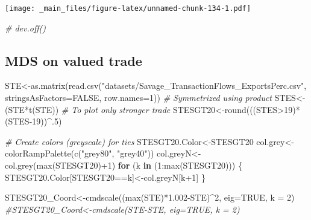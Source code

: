 \documentclass[
  notitlepage,
  onecolumn,
  openany]{book}
\newenvironment{Shaded}{\begin{snugshade}}{\end{snugshade}}
\newcommand{\AttributeTok}[1]{\textcolor[rgb]{0.77,0.63,0.00}{#1}}
\newcommand{\CommentTok}[1]{\textcolor[rgb]{0.56,0.35,0.01}{\textit{#1}}}
\newcommand{\ConstantTok}[1]{\textcolor[rgb]{0.00,0.00,0.00}{#1}}
\newcommand{\ControlFlowTok}[1]{\textcolor[rgb]{0.13,0.29,0.53}{\textbf{#1}}}
\newcommand{\DecValTok}[1]{\textcolor[rgb]{0.00,0.00,0.81}{#1}}
\newcommand{\FloatTok}[1]{\textcolor[rgb]{0.00,0.00,0.81}{#1}}
\newcommand{\FunctionTok}[1]{\textcolor[rgb]{0.00,0.00,0.00}{#1}}
\newcommand{\NormalTok}[1]{#1}
\newcommand{\OtherTok}[1]{\textcolor[rgb]{0.56,0.35,0.01}{#1}}
\newcommand{\SpecialCharTok}[1]{\textcolor[rgb]{0.00,0.00,0.00}{#1}}
\newcommand{\StringTok}[1]{\textcolor[rgb]{0.31,0.60,0.02}{#1}}
\begin{document}
\texttt{[image: \_main\_files/figure-latex/unnamed-chunk-134-1.pdf]}

\begin{Shaded}
\begin{Highlighting}[]
\CommentTok{\# dev.off()}
\end{Highlighting}
\end{Shaded}

\hypertarget{mds-on-valued-trade}{%
\subsection{MDS on valued trade}\label{mds-on-valued-trade}}

\begin{Shaded}
\begin{Highlighting}[]
\NormalTok{STE}\OtherTok{\textless{}{-}}\FunctionTok{as.matrix}\NormalTok{(}\FunctionTok{read.csv}\NormalTok{(}\StringTok{"datasets/Savage\_TransactionFlows\_ExportsPerc.csv"}\NormalTok{,}
                        \AttributeTok{stringsAsFactors=}\ConstantTok{FALSE}\NormalTok{, }\AttributeTok{row.names=}\DecValTok{1}\NormalTok{))}
\CommentTok{\# Symmetrized using product}
\NormalTok{STES}\OtherTok{\textless{}{-}}\NormalTok{(STE}\SpecialCharTok{*}\FunctionTok{t}\NormalTok{(STE))}
\CommentTok{\# To plot only stronger trade }
\NormalTok{STESGT20}\OtherTok{\textless{}{-}}\FunctionTok{round}\NormalTok{(((STES}\SpecialCharTok{\textgreater{}}\DecValTok{19}\NormalTok{)}\SpecialCharTok{*}\NormalTok{(STES}\DecValTok{{-}19}\NormalTok{))}\SpecialCharTok{\^{}}\NormalTok{.}\DecValTok{5}\NormalTok{)}

\CommentTok{\# Create colors (greyscale) for ties}
\NormalTok{STESGT20.Color}\OtherTok{\textless{}{-}}\NormalTok{STESGT20}
\NormalTok{col.grey}\OtherTok{\textless{}{-}}\FunctionTok{colorRampPalette}\NormalTok{(}\FunctionTok{c}\NormalTok{(}\StringTok{"grey80"}\NormalTok{, }\StringTok{"grey40"}\NormalTok{))}
\NormalTok{col.greyN}\OtherTok{\textless{}{-}}\FunctionTok{col.grey}\NormalTok{(}\FunctionTok{max}\NormalTok{(STESGT20)}\SpecialCharTok{+}\DecValTok{1}\NormalTok{)}
\ControlFlowTok{for}\NormalTok{ (k }\ControlFlowTok{in}\NormalTok{ (}\DecValTok{1}\SpecialCharTok{:}\FunctionTok{max}\NormalTok{(STESGT20)))}
\NormalTok{\{}
\NormalTok{    STESGT20.Color[STESGT20}\SpecialCharTok{==}\NormalTok{k]}\OtherTok{\textless{}{-}}\NormalTok{col.greyN[k}\SpecialCharTok{+}\DecValTok{1}\NormalTok{]}
\NormalTok{\}}

\NormalTok{STESGT20\_Coord}\OtherTok{\textless{}{-}}\FunctionTok{cmdscale}\NormalTok{((}\FunctionTok{max}\NormalTok{(STE)}\SpecialCharTok{*}\FloatTok{1.002}\SpecialCharTok{{-}}\NormalTok{STE)}\SpecialCharTok{\^{}}\DecValTok{2}\NormalTok{, }\AttributeTok{eig=}\ConstantTok{TRUE}\NormalTok{, }\AttributeTok{k =} \DecValTok{2}\NormalTok{)}
\CommentTok{\#STESGT20\_Coord\textless{}{-}cmdscale(STE{-}STE, eig=TRUE, k = 2)}


\end{Highlighting}
\end{Shaded}
\end{document}

